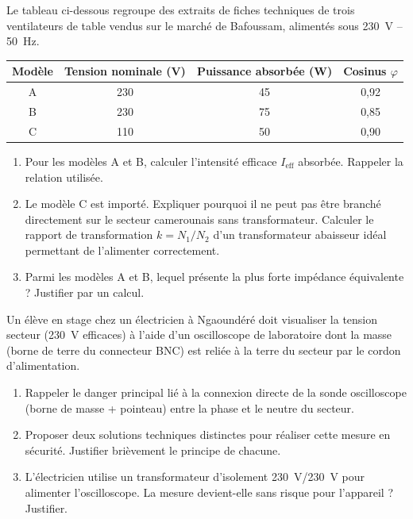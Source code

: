 \documentclass[11pt]{article}
\begin{document}
\begin{exercice}
Le tableau ci-dessous regroupe des extraits de fiches techniques de trois ventilateurs de table vendus sur le marché de Bafoussam, alimentés sous \SI{230}{V} -- \SI{50}{Hz}.

\begin{tabular}{|c|c|c|c|}
\hline
Modèle & Tension nominale (V) & Puissance absorbée (W) & Cosinus $\varphi$ \\ \hline
A & 230 & 45 & 0,92 \\ \hline
B & 230 & 75 & 0,85 \\ \hline
C & 110 & 50 & 0,90 \\ \hline
\end{tabular}

\begin{enumerate}
    \item Pour les modèles A et B, calculer l'intensité efficace $I_{\text{eff}}$ absorbée. Rappeler la relation utilisée.
    \item Le modèle C est importé. Expliquer pourquoi il ne peut pas être branché directement sur le secteur camerounais sans transformateur. Calculer le rapport de transformation $k = N_1/N_2$ d'un transformateur abaisseur idéal permettant de l'alimenter correctement.
    \item Parmi les modèles A et B, lequel présente la plus forte impédance équivalente ? Justifier par un calcul.
\end{enumerate}
\end{exercice}

\begin{exercice}
Un élève en stage chez un électricien à Ngaoundéré doit visualiser la tension secteur (\SI{230}{V} efficaces) à l'aide d'un oscilloscope de laboratoire dont la masse (borne de terre du connecteur BNC) est reliée à la terre du secteur par le cordon d'alimentation.
\begin{enumerate}
    \item Rappeler le danger principal lié à la connexion directe de la sonde oscilloscope (borne de masse + pointeau) entre la phase et le neutre du secteur.
    \item Proposer deux solutions techniques distinctes pour réaliser cette mesure en sécurité. Justifier brièvement le principe de chacune.
    \item L'électricien utilise un transformateur d'isolement \SI{230}{V}/\SI{230}{V} pour alimenter l'oscilloscope. La mesure devient-elle sans risque pour l'appareil ? Justifier.
\end{enumerate}
\end{exercice}
\end{document}
